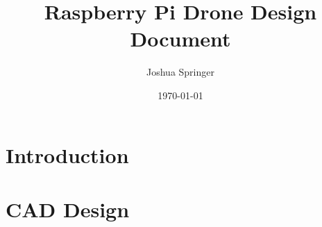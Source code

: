 \documentclass[conference]{IEEEtran}
\author{Joshua Springer}
\title{Raspberry Pi Drone Design Document}
\date{\specialdate\today}
\begin{document}
    \maketitle

    \section{Introduction}
    

    \section{CAD Design}
    

    
    
\end{document}
